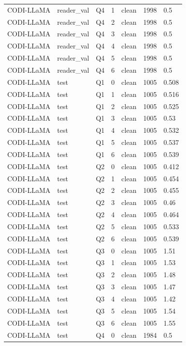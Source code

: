 \begin{longtable}{@{}p{}p{}p{}p{}p{}p{}p{}@{}}
CODI-LLaMA & reader\_val & Q4 & 1 & clean & 1998 & 0.5 \\
CODI-LLaMA & reader\_val & Q4 & 2 & clean & 1998 & 0.5 \\
CODI-LLaMA & reader\_val & Q4 & 3 & clean & 1998 & 0.5 \\
CODI-LLaMA & reader\_val & Q4 & 4 & clean & 1998 & 0.5 \\
CODI-LLaMA & reader\_val & Q4 & 5 & clean & 1998 & 0.5 \\
CODI-LLaMA & reader\_val & Q4 & 6 & clean & 1998 & 0.5 \\
CODI-LLaMA & test & Q1 & 0 & clean & 1005 & 0.508 \\
CODI-LLaMA & test & Q1 & 1 & clean & 1005 & 0.516 \\
CODI-LLaMA & test & Q1 & 2 & clean & 1005 & 0.525 \\
CODI-LLaMA & test & Q1 & 3 & clean & 1005 & 0.53 \\
CODI-LLaMA & test & Q1 & 4 & clean & 1005 & 0.532 \\
CODI-LLaMA & test & Q1 & 5 & clean & 1005 & 0.537 \\
CODI-LLaMA & test & Q1 & 6 & clean & 1005 & 0.539 \\
CODI-LLaMA & test & Q2 & 0 & clean & 1005 & 0.412 \\
CODI-LLaMA & test & Q2 & 1 & clean & 1005 & 0.454 \\
CODI-LLaMA & test & Q2 & 2 & clean & 1005 & 0.455 \\
CODI-LLaMA & test & Q2 & 3 & clean & 1005 & 0.46 \\
CODI-LLaMA & test & Q2 & 4 & clean & 1005 & 0.464 \\
CODI-LLaMA & test & Q2 & 5 & clean & 1005 & 0.533 \\
CODI-LLaMA & test & Q2 & 6 & clean & 1005 & 0.539 \\
CODI-LLaMA & test & Q3 & 0 & clean & 1005 & 1.51 \\
CODI-LLaMA & test & Q3 & 1 & clean & 1005 & 1.53 \\
CODI-LLaMA & test & Q3 & 2 & clean & 1005 & 1.48 \\
CODI-LLaMA & test & Q3 & 3 & clean & 1005 & 1.47 \\
CODI-LLaMA & test & Q3 & 4 & clean & 1005 & 1.42 \\
CODI-LLaMA & test & Q3 & 5 & clean & 1005 & 1.54 \\
CODI-LLaMA & test & Q3 & 6 & clean & 1005 & 1.55 \\
CODI-LLaMA & test & Q4 & 0 & clean & 1984 & 0.5 \\

\end{longtable}
